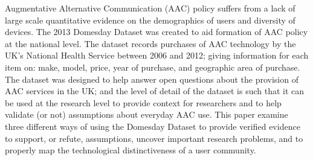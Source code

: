 Augmentative Alternative Communication (AAC) policy suffers from a lack of large scale quantitative evidence on the demographics of users and diversity of devices. The 2013 Domesday Dataset was created to aid formation of AAC policy at the national level. The dataset records  purchases of AAC technology by the UK's National Health Service between 2006 and 2012; giving information for each item on: make, model, price, year of purchase, and geographic area of purchase.  The dataset was designed to help answer open questions about the provision of AAC services in the UK; and the level of detail of the dataset is such that it can be used at the research level to provide context for researchers and to help validate (or not) assumptions about everyday AAC use. This paper examine three different ways of using the Domesday Dataset to provide verified evidence to support, or refute, assumptions, uncover important research problems, and to properly map the technological distinctiveness of a user community.
